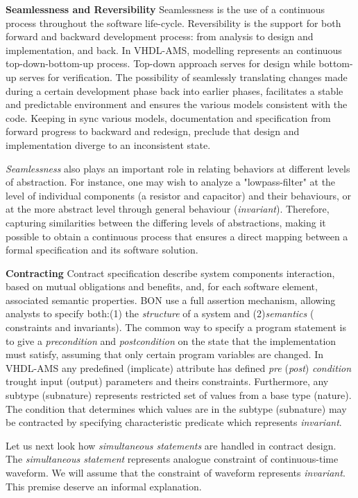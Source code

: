 \documentclass{article}
\newcommand{\inv}{\emph{invariant}\xspace}
\begin{document}
\textbf{Seamlessness and Reversibility} \xspace \xspace Seamlessness
is the use of a continuous process throughout the software
life-cycle. Reversibility is the support for both forward and backward
development process: from analysis to design and implementation, and
back.  In VHDL-AMS, modelling represents an continuous
top-down-bottom-up process. Top-down approach serves for design while
bottom-up serves for verification. The possibility of seamlessly
translating changes made during a certain development phase back into
earlier phases, facilitates a stable and predictable environment and
ensures the various models consistent with the code. Keeping in sync
various models, documentation and specification from forward progress
to backward and redesign, preclude that design and implementation
diverge to an inconsistent state.

\emph{Seamlessness} also plays an important role in relating behaviors
at different levels of abstraction. For instance, one may wish to
analyze a "lowpass-filter" at the level of individual components (a
resistor and capacitor) and their behaviours, or at the more abstract
level through general behaviour (\inv).  Therefore, capturing
similarities between the differing levels of abstractions, making it
possible to obtain a continuous process that ensures a direct mapping
between a formal specification and its software solution.

\textbf{Contracting} \xspace \xspace Contract specification describe
system components interaction, based on mutual obligations and
benefits, and, for each software element, associated semantic
properties. BON use a full assertion mechanism, allowing analysts to
specify both:\xspace (1) the \emph{structure} of a system and
(2)\xspace \emph{semantics} ( constraints and invariants).  The common
way to specify a program statement is to give a \emph{precondition}
and \emph{postcondition} on the state that the implementation must
satisfy, assuming that only certain program variables are changed.  In
VHDL-AMS any predefined (implicate) attribute has defined \emph{pre}
(\emph{post}) \emph{condition} trought input (output) parameters and
theirs constraints. Furthermore, any subtype (subnature) represents
restricted set of values from a base type (nature).  The condition
that determines which values are in the subtype (subnature) may be
contracted by specifying characteristic predicate which represents
\inv.

Let us next look how \emph{simultaneous statements} are handled in
contract design.  The \emph{simultaneous statement} represents
analogue constraint of continuous-time waveform. We will assume that
the constraint of waveform represents \inv. This premise deserve an
informal explanation.
\end{document}
